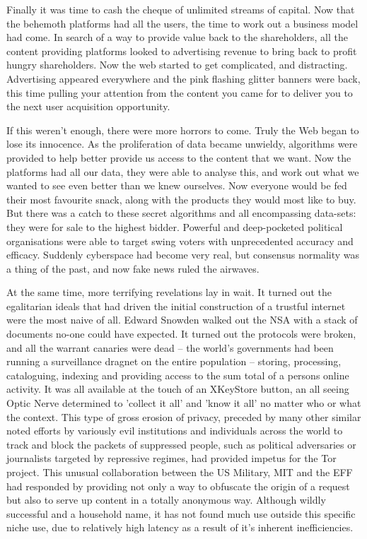 Finally it was time to cash the cheque of unlimited streams of capital. Now that the behemoth platforms had all the users, the time to work out a business model had come. In search of a way to provide value back to the shareholders, all the content providing platforms looked to advertising revenue to bring back to profit hungry shareholders. Now the web started to get complicated, and distracting. Advertising appeared everywhere and the pink flashing glitter banners were back, this time pulling your attention from the content you came for to deliver you to the next user acquisition opportunity.

If this weren't enough, there were more horrors to come. Truly the Web began to lose its innocence. As the proliferation of data became unwieldy, algorithms were provided to help better provide us access to the content that we want. Now the platforms had all our data, they were able to analyse this, and work out what we wanted to see even better than we knew ourselves. Now everyone would be fed their most favourite snack, along with the products they would most like to buy. But there was a catch to these secret algorithms and all encompassing data-sets: they were for sale to the highest bidder. Powerful and deep-pocketed political organisations were able to target swing voters with unprecedented accuracy and efficacy. Suddenly cyberspace had become very real, but consensus normality was a thing of the past, and now fake news ruled the airwaves.

At the same time, more terrifying revelations lay in wait. It turned out the egalitarian ideals that had driven the initial construction of a trustful internet were the most naive of all. Edward Snowden walked out the NSA with a stack of documents no-one could have expected. It turned out the protocols were broken, and all the warrant canaries were dead -- the world's governments had been running a surveillance dragnet on the entire population -- storing, processing, cataloguing, indexing and providing access to the sum total of a persons online activity. It was all available at the touch of an XKeyStore button, an all seeing Optic Nerve determined to 'collect it all' and 'know it all' no matter who or what the context. 
This type of gross erosion of privacy, preceded by many other similar noted efforts by variously evil institutions and individuals across the world to track and block the packets of suppressed people, such as political adversaries or journalists targeted by repressive regimes, had provided impetus for the Tor project. This unusual collaboration between the US Military, MIT and the EFF had responded by providing not only a way to obfuscate the origin of a request but also to serve up content in a totally anonymous way. Although wildly successful and a household name, it has not found much use outside this specific niche use, due to relatively high latency as a result of it's inherent inefficiencies. 

